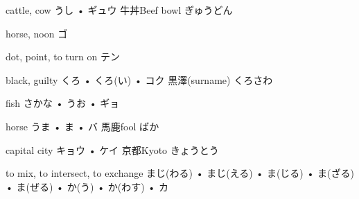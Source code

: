 



\setcounter{cardnum}{89}

		{cattle, cow}
		{うし • ギュウ}
		{牛丼}{Beef bowl ぎゅうどん}
		{}{}
		{}{}
		{}{}
		{}{}

		{horse, noon}
		{ゴ}
		{}{}
		{}{}
		{}{}
		{}{}
		{}{}

		{dot, point, to turn on}
		{テン}
		{}{}
		{}{}
		{}{}
		{}{}
		{}{}

		{black, guilty}
		{くろ • くろ(い) • コク}
		{黒澤}{(surname) くろさわ}
		{}{}
		{}{}
		{}{}
		{}{}

		{fish}
		{さかな • うお • ギョ}
		{}{}
		{}{}
		{}{}
		{}{}
		{}{}

		{horse}
		{うま • ま • バ}
		{馬鹿}{fool ばか}
		{}{}
		{}{}
		{}{}
		{}{}

		{capital city}
		{キョウ • ケイ}
		{京都}{Kyoto きょうとう}
		{}{}
		{}{}
		{}{}
		{}{}

		{to mix, to intersect, to exchange}
		{まじ(わる) • まじ(える) • ま(じる) • ま(ざる) • ま(ぜる) • か(う) • か(わす) • カ}
		{}{}
		{}{}
		{}{}
		{}{}
		{}{}

